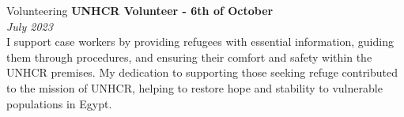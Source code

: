 \documentclass{resume}
\begin{document}
\begin{rSection}{Volunteering} {\textbf{UNHCR Volunteer - 6th of October}}{ \\ \textit{July 2023}}{} \itemsep -3pt
\\
I support case workers by providing refugees with essential information, guiding them through procedures, and ensuring their comfort and safety within the UNHCR premises. My dedication to supporting those seeking refuge contributed to the mission of UNHCR, helping to restore hope and stability to vulnerable populations in Egypt.

\end{rSection}
\end{document}
